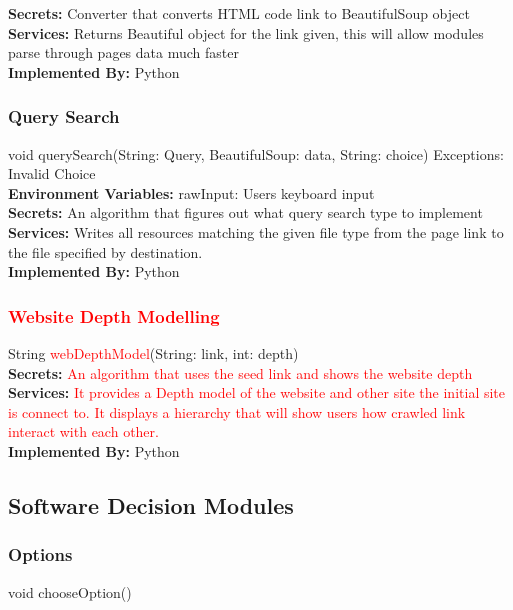 \documentclass[titlepage]{article}
\begin{document}
\textbf{Secrets:}
Converter that converts HTML code link to BeautifulSoup object \\

\textbf{Services:}
Returns Beautiful object for the link given, this will allow modules parse through pages data much faster\\

\textbf{Implemented By:} Python

\subsubsection{Query Search}
void querySearch(String: Query, BeautifulSoup: data, String: choice) Exceptions: Invalid Choice\\

\textbf{Environment Variables:}
rawInput: Users keyboard input\\

\textbf{Secrets:}
An algorithm that figures out what query search type to implement \\

\textbf{Services:}
Writes all resources matching the given file type from the page link to the file specified by destination.\\

\textbf{Implemented By:}
Python

\subsubsection{\textcolor{red}{Website Depth Modelling}}
String \textcolor{red}{webDepthModel}(String: link, int: depth)\\

\textbf{Secrets:}
 \textcolor{red}{An algorithm that uses the seed link and shows the website depth}\\
 
\textbf{Services:}
\textcolor{red}{It provides a Depth model of the website and other site the initial site is connect to. It displays a hierarchy that will show users how crawled link interact with each other.}\\

\textbf{Implemented By:}
Python

\subsection{Software Decision Modules}
\subsubsection{Options}
void chooseOption()\\
\end{document}

